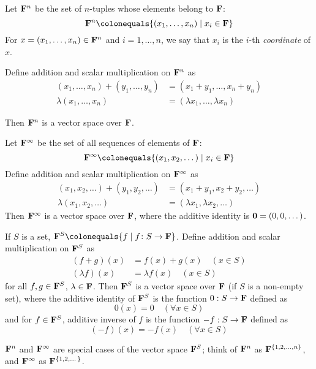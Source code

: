 \begin{example}
Let $\mathbf F^n$ be the set of $n$-tuples whose elements belong to $\mathbf F$:
\[\FF^n\colonequals\{(x_1,\dots,x_n)\mid x_i\in\FF\}\]
For $x=(x_1,\dots,x_n)\in\mathbf F^n$ and $i=1,\dots,n$, we say that $x_i$ is the $i$-th \emph{coordinate} of $x$.

Define addition and scalar multiplication on $\mathbf F^n$ as
\begin{align*}
(x_1,\dots,x_n)+(y_1,\dots,y_n)&=(x_1+y_1,\dots,x_n+y_n)\\
\lambda(x_1,\dots,x_n)&=(\lambda x_1,\dots,\lambda x_n)
\end{align*}

Then $\mathbf F^n$ is a vector space over $\mathbf F$.
\end{example}

\begin{example}
Let $\mathbf F^\infty$ be the set of all sequences of elements of $\mathbf F$:
\[\FF^\infty\colonequals\{(x_1,x_2,\dots)\mid x_i\in\FF\}\]
Define addition and scalar multiplication on $\mathbf F^\infty$ as
\begin{align*}
(x_1,x_2,\dots)+(y_1,y_2,\dots)&=(x_1+y_1,x_2+y_2,\dots)\\
\lambda(x_1,x_2,\dots)&=(\lambda x_1,\lambda x_2,\dots)
\end{align*}
Then $\mathbf F^\infty$ is a vector space over $\mathbf F$, where the additive identity is $\vb{0}=(0,0,\dots)$.
\end{example}

\begin{example}
If $S$ is a set, $\FF^S\colonequals\{f\mid f\colon S\to\FF\}$. Define addition and scalar multiplication on $\mathbf F^S$ as
\begin{align*}
(f+g)(x)&=f(x)+g(x)\quad(x\in S)\\
(\lambda f)(x)&=\lambda f(x)\quad(x\in S)
\end{align*}
for all $f,g\in\mathbf F^S$, $\lambda\in\mathbf F$.
Then $\mathbf F^S$ is a vector space over $\mathbf F$ (if $S$ is a non-empty set), where the additive identity of $\mathbf F^S$ is the function $0:S\to\mathbf F$ defined as
\[0(x)=0\quad(\forall x\in S)\]
and for $f\in\mathbf F^S$, additive inverse of $f$ is the function $-f:S\to\mathbf F$ defined as
\[(-f)(x)=-f(x)\quad(\forall x\in S)\]
\end{example}

\begin{remark}
$\mathbf F^n$ and $\mathbf F^\infty$ are special cases of the vector space $\mathbf F^S$; think of $\mathbf F^n$ as $\mathbf F^{\{1,2,\dots,n\}}$, and $\mathbf F^\infty$ as $\mathbf F^{\{1,2,\dots\}}$.
\end{remark}

